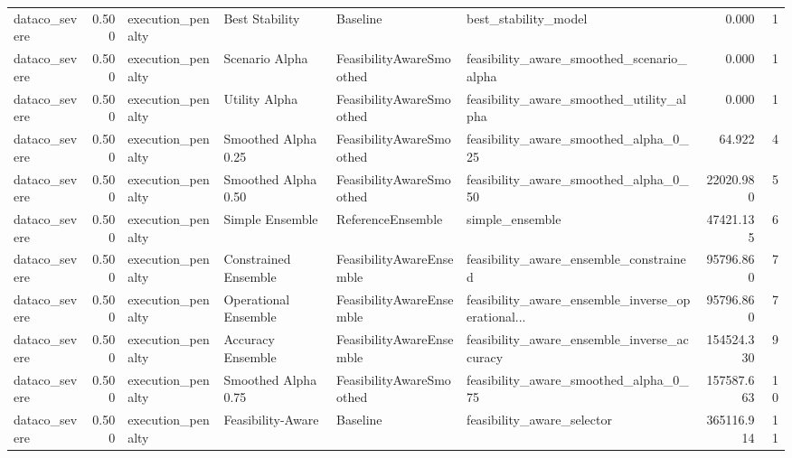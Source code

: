 \begin{table}
{\begin{tabular}{lrllllrr}
 dataco\_severe &             0.500 &           execution\_penalty &        Best Stability &                  Baseline &                               best\_stability\_model &         0.000 &               1 \\
 dataco\_severe &             0.500 &           execution\_penalty &        Scenario Alpha &  FeasibilityAwareSmoothed &          feasibility\_aware\_smoothed\_scenario\_alpha &         0.000 &               1 \\
 dataco\_severe &             0.500 &           execution\_penalty &         Utility Alpha &  FeasibilityAwareSmoothed &           feasibility\_aware\_smoothed\_utility\_alpha &         0.000 &               1 \\
 dataco\_severe &             0.500 &           execution\_penalty &   Smoothed Alpha 0.25 &  FeasibilityAwareSmoothed &              feasibility\_aware\_smoothed\_alpha\_0\_25 &        64.922 &               4 \\
 dataco\_severe &             0.500 &           execution\_penalty &   Smoothed Alpha 0.50 &  FeasibilityAwareSmoothed &              feasibility\_aware\_smoothed\_alpha\_0\_50 &     22020.980 &               5 \\
 dataco\_severe &             0.500 &           execution\_penalty &       Simple Ensemble &         ReferenceEnsemble &                                    simple\_ensemble &     47421.135 &               6 \\
 dataco\_severe &             0.500 &           execution\_penalty &  Constrained Ensemble &  FeasibilityAwareEnsemble &             feasibility\_aware\_ensemble\_constrained &     95796.860 &               7 \\
 dataco\_severe &             0.500 &           execution\_penalty &  Operational Ensemble &  FeasibilityAwareEnsemble &  feasibility\_aware\_ensemble\_inverse\_operational... &     95796.860 &               7 \\
 dataco\_severe &             0.500 &           execution\_penalty &     Accuracy Ensemble &  FeasibilityAwareEnsemble &        feasibility\_aware\_ensemble\_inverse\_accuracy &    154524.330 &               9 \\
 dataco\_severe &             0.500 &           execution\_penalty &   Smoothed Alpha 0.75 &  FeasibilityAwareSmoothed &              feasibility\_aware\_smoothed\_alpha\_0\_75 &    157587.663 &              10 \\
 dataco\_severe &             0.500 &           execution\_penalty &     Feasibility-Aware &                  Baseline &                         feasibility\_aware\_selector &    365116.914 &              11 \\

\end{tabular}}
\end{table}
